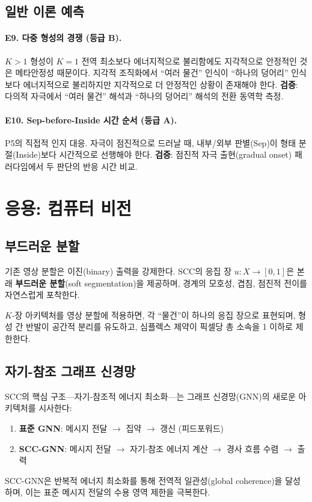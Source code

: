 \subsection{일반 이론 예측}

\paragraph{E9. 다중 형성의 경쟁 (등급 B).}
$K > 1$ 형성이 $K = 1$ 전역 최소보다 에너지적으로 불리함에도 지각적으로 안정적인 것은 메타안정성 때문이다. 지각적 조직화에서 ``여러 물건'' 인식이 ``하나의 덩어리'' 인식보다 에너지적으로 불리하지만 지각적으로 더 안정적인 상황이 존재해야 한다. \textbf{검증}: 다의적 자극에서 ``여러 물건'' 해석과 ``하나의 덩어리'' 해석의 전환 동역학 측정.

\paragraph{E10. Sep-before-Inside 시간 순서 (등급 A).}
P5의 직접적 인지 대응. 자극이 점진적으로 드러날 때, 내부/외부 판별(Sep)이 형태 분절(Inside)보다 시간적으로 선행해야 한다. \textbf{검증}: 점진적 자극 출현(gradual onset) 패러다임에서 두 판단의 반응 시간 비교.


\section{응용: 컴퓨터 비전}
\label{sec:cv-applications}

\subsection{부드러운 분할}

기존 영상 분할은 이진(binary) 출력을 강제한다. SCC의 응집 장 $u : X \to [0,1]$은 본래 \textbf{부드러운 분할}(soft segmentation)을 제공하며, 경계의 모호성, 겹침, 점진적 전이를 자연스럽게 포착한다.

$K$-장 아키텍처를 영상 분할에 적용하면, 각 ``물건''이 하나의 응집 장으로 표현되며, 형성 간 반발이 공간적 분리를 유도하고, 심플렉스 제약이 픽셀당 총 소속을 1 이하로 제한한다.

\subsection{자기-참조 그래프 신경망}

SCC의 핵심 구조---자기-참조적 에너지 최소화---는 그래프 신경망(GNN)의 새로운 아키텍처를 시사한다:
\begin{enumerate}
    \item \textbf{표준 GNN}: 메시지 전달 $\to$ 집약 $\to$ 갱신 (피드포워드)
    \item \textbf{SCC-GNN}: 메시지 전달 $\to$ 자기-참조 에너지 계산 $\to$ 경사 흐름 수렴 $\to$ 출력
\end{enumerate}
SCC-GNN은 반복적 에너지 최소화를 통해 전역적 일관성(global coherence)을 달성하며, 이는 표준 메시지 전달의 수용 영역 제한을 극복한다.


